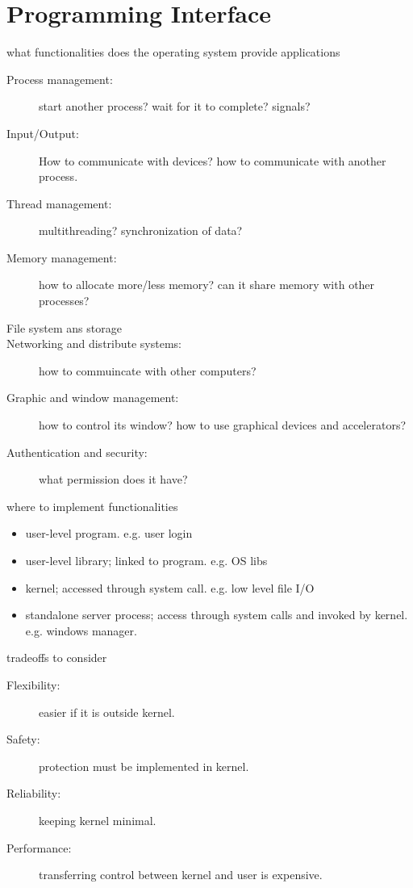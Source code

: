\chapter{Programming Interface}
what functionalities does the operating system provide applications 
\begin{description}
    \item[Process management:] start another process? wait for it to complete? signals?
    \item[Input/Output:] How to communicate with devices? how to communicate with another process.
    \item[Thread management:] multithreading? synchronization of data?
    \item[Memory management:] how to allocate more/less memory? can it share memory with other processes?
    \item[File system ans storage]
    \item[Networking and distribute systems:] how to commuincate with other computers?
    \item[Graphic and window management:] how to control its window? how to use graphical devices and accelerators?
    \item[Authentication and security:] what permission does it have?        
\end{description}

where to implement functionalities
\begin{itemize}
    \item user-level program. e.g. user login
    \item user-level library; linked to program. e.g. OS libs 
    \item kernel; accessed through system call. e.g. low level file I/O
    \item standalone server process; access through system calls and invoked by kernel. e.g. windows manager.
\end{itemize}

tradeoffs to consider 
\begin{description}
    \item[Flexibility:] easier if it is outside kernel.
    \item[Safety:] protection must be implemented in kernel.
    \item[Reliability:] keeping kernel minimal.
    \item[Performance:] transferring control between kernel and user is expensive.    
\end{description}
